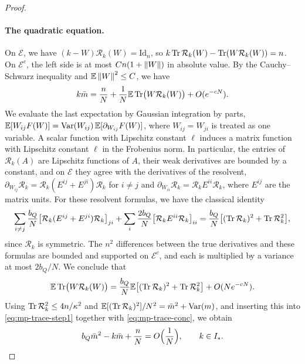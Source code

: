 \begin{proof}
\paragraph{The quadratic equation.}
On $\mathcal E$, we have $(k-W)\mathcal R_k(W)=\mathrm{Id}_n$, so $k\operatorname{Tr}\mathcal R_k(W)-\operatorname{Tr}(W\mathcal R_k(W))=n$. On $\mathcal E^c$, the left side is at most $Cn(1+\left\lVert W\right\rVert)$ in absolute value. By the Cauchy--Schwarz inequality and $\mathbb E\left\lVert W\right\rVert^2\le C$, we have
\begin{equation}\label{eq:mp-trace-step1}
k\bar m=\frac nN+\frac1N\mathbb E\operatorname{Tr}\bigl(W\mathcal R_k(W)\bigr)+O(e^{-cN}).
\end{equation}
We evaluate the last expectation by Gaussian integration by parts, $\mathbb E[W_{ij}F(W)]=\operatorname{Var}(W_{ij})\,\mathbb E[\partial_{W_{ij}}F(W)]$, where $W_{ij}=W_{ji}$ is treated as one variable. A scalar function with Lipschitz constant $\ell$ induces a matrix function with Lipschitz constant $\ell$ in the Frobenius norm. In particular, the entries of $\mathcal R_k(A)$ are Lipschitz functions of $A$, their weak derivatives are bounded by a constant, and on $\mathcal E$ they agree with the derivatives of the resolvent, $\partial_{W_{ij}}\mathcal R_k=\mathcal R_k(E^{ij}+E^{ji})\mathcal R_k$ for $i\ne j$ and $\partial_{W_{ii}}\mathcal R_k=\mathcal R_kE^{ii}\mathcal R_k$, where $E^{ij}$ are the matrix units. For these resolvent formulas, we have the classical identity
\[
\sum_{i\ne j}\frac{b_Q}N\bigl[\mathcal R_k(E^{ij}+E^{ji})\mathcal R_k\bigr]_{ji}+\sum_i\frac{2b_Q}N\bigl[\mathcal R_kE^{ii}\mathcal R_k\bigr]_{ii}=\frac{b_Q}N\bigl[(\operatorname{Tr}\mathcal R_k)^2+\operatorname{Tr}\mathcal R_k^2\bigr],
\]
since $\mathcal R_k$ is symmetric. The $n^2$ differences between the true derivatives and these formulas are bounded and supported on $\mathcal E^c$, and each is multiplied by a variance at most $2b_Q/N$. We conclude that
\[
\mathbb E\operatorname{Tr}\bigl(W\mathcal R_k(W)\bigr)=\frac{b_Q}N\mathbb E\bigl[(\operatorname{Tr}\mathcal R_k)^2+\operatorname{Tr}\mathcal R_k^2\bigr]+O(Ne^{-cN}).
\]
Using $\operatorname{Tr}\mathcal R_k^2\le4n/\kappa^2$ and $\mathbb E[(\operatorname{Tr}\mathcal R_k)^2]/N^2=\bar m^2+\operatorname{Var}(m)$, and inserting this into \eqref{eq:mp-trace-step1} together with \eqref{eq:mp-trace-conc}, we obtain
\begin{equation}\label{eq:mp-quadratic}
b_Q\bar m^2-k\bar m+\frac nN=O\Bigl(\frac1N\Bigr),\qquad k\in I_*.
\end{equation}


\end{proof}
